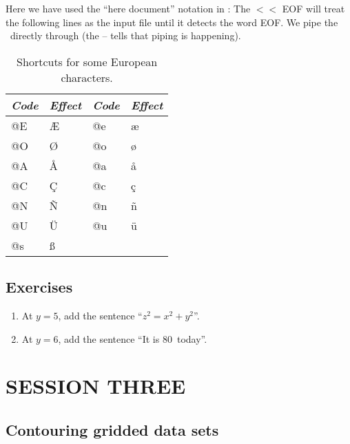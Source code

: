 \documentclass{report}
\begin{document}

Here we have used the ``here document'' notation in \UNIX: The $<$$<$ EOF
will treat the following lines as the input file until it detects the
word EOF.  We pipe the \PS\ directly through  (the -- tells
 that piping is happening).

\begin{table}[H]
\centering
\begin{tabular}{|l|l||l|l|} \hline
\emph{Code} & \emph{Effect}  & \emph{Code} & \emph{Effect} \\ \hline
@E &  \AE   & @e &  \ae   \\ \hline
@O &  \O    & @o &  \o    \\ \hline
@A &  \AA   & @a &  \aa   \\ \hline
@C &  \c{C} & @c &  \c{c} \\ \hline
@N &  \~{N} & @n &  \~{n} \\ \hline
@U &  \"{U} & @u &  \"{u} \\ \hline
@s &  \ss   &    &        \\ \hline
\end{tabular}
\caption{Shortcuts for some European characters.}
\label{tbl:scand}
\end{table}

\section{Exercises}

\begin{enumerate}

\item At $y = 5$, add the sentence ``$z^2 = x^2 + y^2$''.

\item At $y = 6$, add the sentence ``It is 80\DS\ today''.

\end{enumerate}

\chapter{SESSION THREE}
\thispagestyle{headings}

\section{Contouring gridded data sets}
\end{document}
